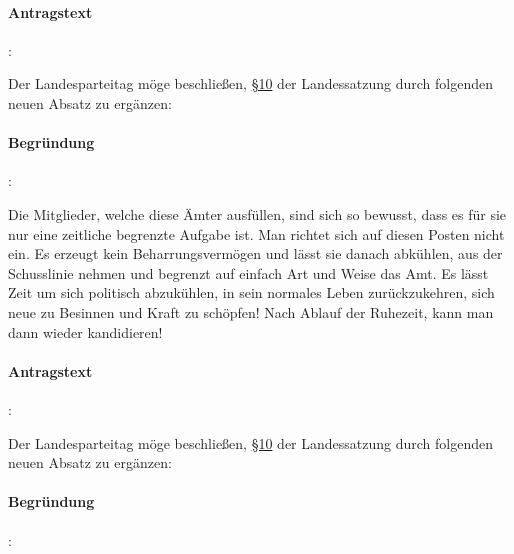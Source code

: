 

\paragraph{Antragstext}:

Der Landesparteitag möge beschließen, \href{http://wiki.piratenpartei.de/LSA:Satzung#.C2.A7_10_-_Bewerberaufstellung_f.C3.BCr_die_Wahlen_zu_Volksvertretungen}{§10} der Landessatzung durch folgenden neuen Absatz zu ergänzen:


\paragraph{Begründung}:

Die Mitglieder, welche diese Ämter ausfüllen, sind sich so bewusst, dass es für sie nur eine zeitliche begrenzte Aufgabe ist. Man richtet sich auf diesen Posten nicht ein. Es erzeugt kein Beharrungsvermögen und lässt sie danach abkühlen, aus der Schusslinie nehmen und begrenzt auf einfach Art und Weise das Amt. Es lässt Zeit um sich politisch abzukühlen, in sein normales Leben zurückzukehren, sich neue zu Besinnen und Kraft zu schöpfen! Nach Ablauf der Ruhezeit, kann man dann wieder kandidieren!



\paragraph{Antragstext}:

Der Landesparteitag möge beschließen, \href{http://wiki.piratenpartei.de/LSA:Satzung#.C2.A7_10_-_Bewerberaufstellung_f.C3.BCr_die_Wahlen_zu_Volksvertretungen}{§10} der Landessatzung durch folgenden neuen Absatz zu ergänzen:


\paragraph{Begründung}:

